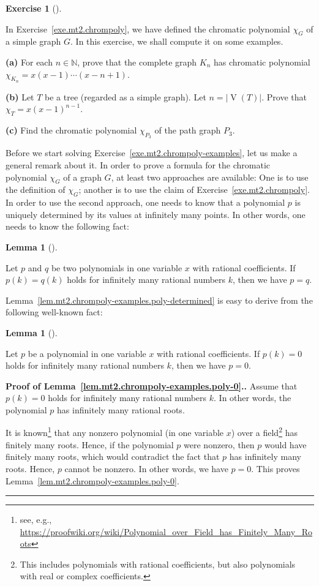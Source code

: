 \documentclass[numbers=enddot,12pt,final,onecolumn,notitlepage]{scrartcl}%
\newcounter{exer}
\theoremstyle{definition}
\newtheorem{lem}[theo]{Lemma}
\newenvironment{lemma}[1][]
{\begin{lem}[#1]\begin{leftbar}}
{\end{leftbar}\end{lem}}
\newtheorem{exmp}[exer]{Exercise}
\newenvironment{exercise}[1][]
{\begin{exmp}[#1]\begin{leftbar}}
{\end{leftbar}\end{exmp}}
\newenvironment{proof}[1][Proof]{\noindent\textbf{#1.} }{\ \rule{0.5em}{0.5em}}
\newcommand{\NN}{\mathbb{N}}
\newcommand{\abs}[1]{\left| #1 \right|}
\newcommand{\tup}[1]{\left( #1 \right)}
\newcommand{\verts}[1]{\operatorname{V}\left( #1 \right)}
\begin{document}
\begin{exercise} \label{exe.mt2.chrompoly-examples}
In Exercise~\ref{exe.mt2.chrompoly}, we have defined the chromatic
polynomial $\chi_G$ of a simple graph $G$.
In this exercise, we shall compute it on some examples.

\textbf{(a)} For each $n \in \NN$, prove that the complete graph $K_n$
has chromatic polynomial
$\chi_{K_n} = x \tup{x-1} \cdots \tup{x-n+1}$.

\textbf{(b)} Let $T$ be a tree (regarded as a simple graph).
Let $n = \abs{\verts{T}}$.
Prove that $\chi_T = x \tup{x-1}^{n-1}$.

\textbf{(c)} Find the chromatic polynomial $\chi_{P_3}$ of the path
graph $P_3$.
\end{exercise}

Before we start solving Exercise~\ref{exe.mt2.chrompoly-examples},
let us make a general remark about it.
In order to prove a formula for the chromatic polynomial $\chi_G$
of a graph $G$, at least two approaches are available:
One is to use the definition of $\chi_G$; another is to
use the claim of Exercise~\ref{exe.mt2.chrompoly}.
In order to use the second approach, one needs to know that a
polynomial $p$ is uniquely determined by its values at
infinitely many points.
In other words, one needs to know the following fact:

\begin{lemma} \label{lem.mt2.chrompoly-examples.poly-determined}
Let $p$ and $q$ be two polynomials in one variable $x$
with rational coefficients.
If $p \tup{k} = q \tup{k}$ holds for infinitely many
rational numbers $k$, then we have $p = q$.
\end{lemma}

Lemma~\ref{lem.mt2.chrompoly-examples.poly-determined} is easy
to derive from the following well-known fact:

\begin{lemma} \label{lem.mt2.chrompoly-examples.poly-0}
Let $p$ be a polynomial in one variable $x$
with rational coefficients.
If $p \tup{k} = 0$ holds for infinitely many
rational numbers $k$, then we have $p = 0$.
\end{lemma}

\begin{proof}[Proof of
Lemma~\ref{lem.mt2.chrompoly-examples.poly-0}.]
Assume that $p \tup{k} = 0$ holds for infinitely many
rational numbers $k$.
In other words, the polynomial $p$ has infinitely
many rational roots.

It is known\footnote{see, e.g.,
\url{https://proofwiki.org/wiki/Polynomial_over_Field_has_Finitely_Many_Roots}}
that any nonzero polynomial (in one variable $x$)
over a field\footnote{This
includes polynomials with rational coefficients,
but also polynomials with real or complex
coefficients.} has finitely many roots.
Hence, if the polynomial $p$ were nonzero, then $p$
would have finitely many roots, which would contradict
the fact that $p$ has infinitely many roots.
Hence, $p$ cannot be nonzero.
In other words, we have $p = 0$.
This proves Lemma~\ref{lem.mt2.chrompoly-examples.poly-0}.
\end{proof}
\end{document}

